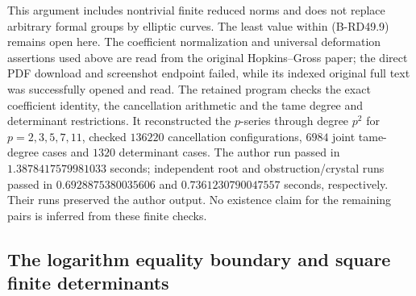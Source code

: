 \begin{remark}
\label{rem:B-RD49-scope}
This argument includes nontrivial finite reduced norms and does
not replace arbitrary formal groups by elliptic curves. The
least value within (B-RD49.9) remains open here. The coefficient
normalization and universal deformation assertions used above
are read from the original Hopkins--Gross paper; the direct PDF
download and screenshot endpoint failed, while its indexed
original full text was successfully opened and read.
The retained program 
checks the exact coefficient identity, the cancellation
arithmetic and the tame degree and determinant restrictions.
It reconstructed the $p$-series through degree $p^2$ for
$p=2,3,5,7,11$, checked $136220$ cancellation configurations,
$6984$ joint tame-degree cases and $1320$ determinant cases.
The author run passed in $1.3878417579981033$ seconds; independent
root and obstruction/crystal runs passed in $0.6928875380035606$
and $0.7361230790047557$ seconds, respectively. Their runs preserved
the author output. No existence claim for the remaining pairs is
inferred from these finite checks.
\end{remark}


\subsection{The logarithm equality boundary and square finite determinants}

